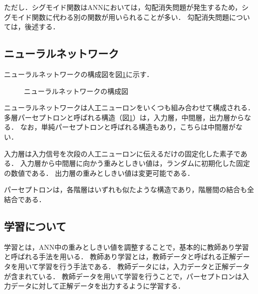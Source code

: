 \documentclass[a4j,12pt,dvipdfmx]{jreport}
\begin{document}
ただし．シグモイド関数はANNにおいては，勾配消失問題が発生するため，シグモイド関数に代わる別の関数が用いられることが多い．
勾配消失問題については，後述する．

\subsection{ニューラルネットワーク}
ニューラルネットワークの構成図を図\ref{fig:perceptron}に示す．

\begin{figure}[ht]
  \centering
  \caption{ニューラルネットワークの構成図}
  \label{fig:perceptron}
\end{figure}
ニューラルネットワークは人工ニューロンをいくつも組み合わせて構成される．
多層パーセプトロンと呼ばれる構造（図\ref{fig:perceptron}）は，入力層，中間層，出力層からなる．
なお，単純パーセプトロンと呼ばれる構造もあり，こちらは中間層がない．

入力層は入力信号を次段の人工ニューロンに伝えるだけの固定化した素子である．
入力層から中間層に向かう重みとしきい値は，ランダムに初期化した固定の数値である．
出力層の重みとしきい値は変更可能である．

パーセプトロンは，各階層はいずれも似たような構造であり，階層間の結合も全結合である．


\subsection{学習について}
学習とは，ANN中の重みとしきい値を調整することで，基本的に教師あり学習と呼ばれる手法を用いる．
教師あり学習とは，教師データと呼ばれる正解データを用いて学習を行う手法である．
教師データには，入力データと正解データが含まれている．
教師データを用いて学習を行うことで，パーセプトロンは入力データに対して正解データを出力するように学習する．
\end{document}
